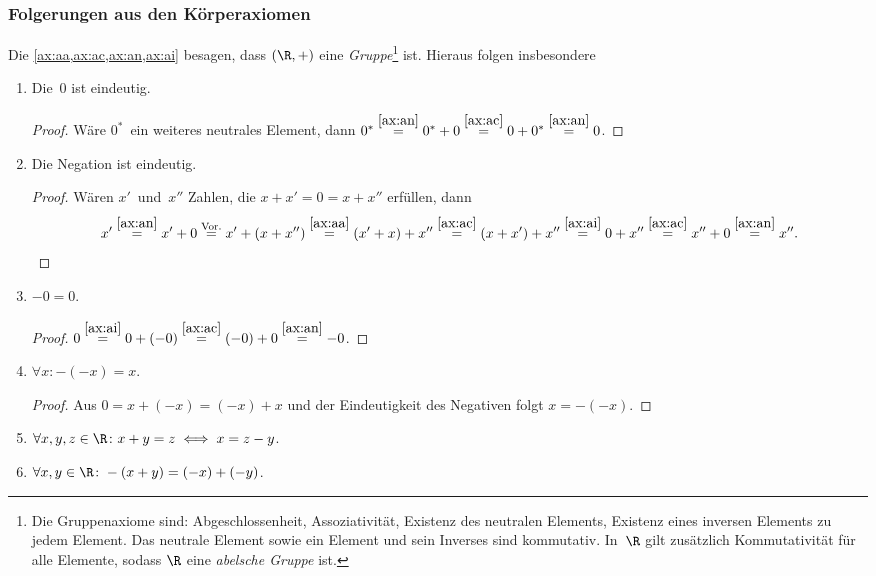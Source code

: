 \documentclass[a4paper]{article}
\begin{document}
\subsubsection{Folgerungen aus den Körperaxiomen}

Die \cref{ax:aa,ax:ac,ax:an,ax:ai} besagen, dass $(\R,+)$ eine \emph{Gruppe}\footnote{Die Gruppenaxiome sind: Abgeschlossenheit, Assoziativität, Existenz des neutralen Elements, Existenz eines inversen Elements zu jedem Element. Das neutrale Element sowie ein Element und sein Inverses sind kommutativ. In~$\R$ gilt zusätzlich Kommutativität für alle Elemente, sodass $\R$ eine \emph{abelsche Gruppe} ist.} ist. Hieraus folgen insbesondere
\begin{enumerate}[label=\textnormal{(\alph*)}, leftmargin=*, widest=(m), series=conclusions]
    \item Die~$0$ ist eindeutig.
          \begin{proof}
              Wäre $0^*$~ein weiteres neutrales Element, dann $0^* \overset{\ref{ax:an}}{=} 0^* + 0 \overset{\ref{ax:ac}}{=} 0 + 0^* \overset{\ref{ax:an}}{=} 0$.
          \end{proof}
    \item Die Negation ist eindeutig.
          \begin{proof}
              Wären $x'$~und~$x''$ Zahlen, die $x + x' = 0 = x + x''$ erfüllen, dann
              \begin{equation*}
                  x' \overset{\ref{ax:an}}{=} x' + 0 \overset{\text{Vor.}}{=} x' + (x + x'') \overset{\ref{ax:aa}}{=} (x' + x) + x'' \overset{\ref{ax:ac}}{=} (x + x') + x'' \overset{\ref{ax:ai}}{=} 0 + x'' \overset{\ref{ax:ac}}{=} x'' + 0 \overset{\ref{ax:an}}{=} x''.\qedhere
              \end{equation*}
          \end{proof}
    \item $-0 = 0$.
          \begin{proof}
              $0 \overset{\ref{ax:ai}}{=} 0 + (-0) \overset{\ref{ax:ac}}{=} (-0) + 0 \overset{\ref{ax:an}}{=} -0$.
          \end{proof}
    \item $\forall x\colon - (-x) = x$.
          \begin{proof}
              Aus $0 = x + (-x) = (-x) + x$ und der Eindeutigkeit des Negativen folgt $x = - (-x)$.
          \end{proof}
    \item $\forall x, y, z \in \R\colon x + y = z \iff x = z - y$.\label{ax:addequiv}
    \item $\forall x, y \in \R\colon -(x + y) = (-x) + (-y)$.
\end{enumerate}
\end{document}
